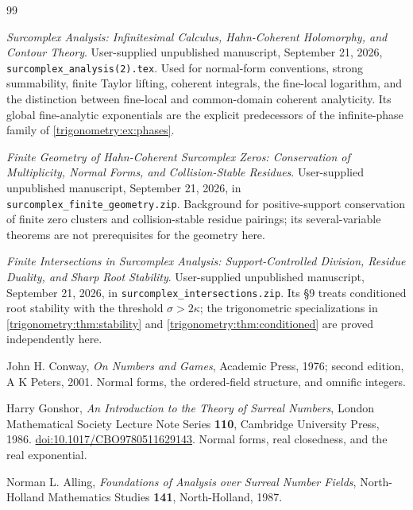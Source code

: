 \documentclass[11pt,letterpaper]{article}
\numberwithin{equation}{section}
\theoremstyle{definition}
\theoremstyle{remark}
\begin{document}
\begingroup
\small
\setlength{\parskip}{0pt}
\begin{thebibliography}{99}
\setlength{\itemsep}{0.35em}
\raggedright
{}

\emph{Surcomplex Analysis: Infinitesimal Calculus, Hahn-Coherent Holomorphy, and Contour Theory}.
User-supplied unpublished manuscript, September 21, 2026,
\texttt{surcomplex\_analysis(2).tex}.
Used for normal-form conventions, strong summability, finite Taylor lifting, coherent integrals,
the fine-local logarithm, and the distinction between fine-local and common-domain coherent
analyticity. Its global fine-analytic exponentials are the explicit predecessors of the
infinite-phase family of \cref{trigonometry:ex:phases}.

\emph{Finite Geometry of Hahn-Coherent Surcomplex Zeros: Conservation of Multiplicity, Normal
Forms, and Collision-Stable Residues}. User-supplied unpublished manuscript, September 21, 2026,
in \texttt{surcomplex\_finite\_geometry.zip}.
Background for positive-support conservation of finite zero clusters and collision-stable residue
pairings; its several-variable theorems are not prerequisites for the geometry here.

\emph{Finite Intersections in Surcomplex Analysis: Support-Controlled Division, Residue Duality,
and Sharp Root Stability}. User-supplied unpublished manuscript, September 21, 2026, in
\texttt{surcomplex\_intersections.zip}.
Its \S9 treats conditioned root stability with the threshold $\sigma>2\kappa$; the trigonometric
specializations in \cref{trigonometry:thm:stability} and \cref{trigonometry:thm:conditioned} are
proved independently here.

John H. Conway, \emph{On Numbers and Games}, Academic Press, 1976; second edition, A K Peters,
2001. Normal forms, the ordered-field structure, and omnific integers.

Harry Gonshor, \emph{An Introduction to the Theory of Surreal Numbers},
London Mathematical Society Lecture Note Series \textbf{110}, Cambridge University Press, 1986.
\href{https://doi.org/10.1017/CBO9780511629143}{doi:10.1017/CBO9780511629143}.
Normal forms, real closedness, and the real exponential.

Norman L. Alling, \emph{Foundations of Analysis over Surreal Number Fields},
North-Holland Mathematics Studies \textbf{141}, North-Holland, 1987.


\end{thebibliography}
\end{document}
